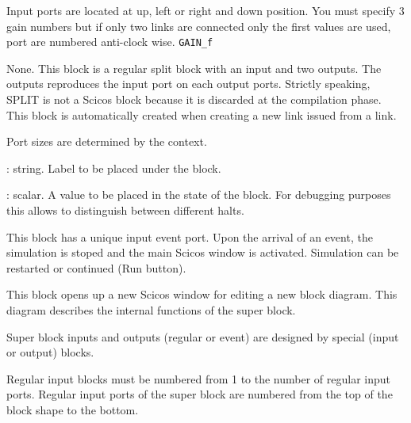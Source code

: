 Input ports are located at up, left or right and down position.
You must specify 3 gain numbers but if only two links are 
connected only the first values are used, port are numbered  anti-clock wise.
{\verb?GAIN_f?} \pageref{GAINf}







%
%


\label{SPLITf}

None.
This block is a regular split block with an input and two outputs. The
outputs reproduces the input port on each output ports. 
Strictly speaking, SPLIT is not a Scicos block because it is
discarded at the compilation phase. This block is automatically
created when creating a new link issued from a link.

Port sizes are determined by the context.


%
%


\label{CLOCKf}

\begin{scitem}
\item[{\verb?Block label?}]
: string. Label to be placed under the block.
\item[{\verb?State on halt?}]
: scalar. A value to be placed in the state of the block. For
debugging purposes this allows to distinguish between different
halts.
\end{scitem}%
This block has a unique input event port. Upon the arrival of an
event,
the simulation is stoped and the main Scicos window is activated.
Simulation can be restarted or continued (Run button).








%
%


\label{SUPERf}

This block opens up a new Scicos window for editing a new block
diagram. This diagram describes the internal functions of the
super block. 
\par\noindent
Super block  inputs and outputs (regular or event) are designed by
special (input or output)  blocks.
\par\noindent
Regular input blocks must be numbered from 1 to the number of regular
input ports. Regular input ports of the super block are numbered from
the top of the block shape to the bottom.
\par\noindent

